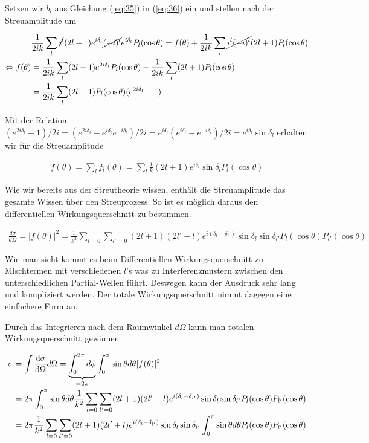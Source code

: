 Setzen wir \(b_l\) aus Gleichung (\ref{eq:35}) in (\ref{eq:36}) ein und stellen nach der Streuamplitude um

\begin{align}
  \label{eq:37}
  &\frac{1}{2ik} \sum_l \cancel{i^{l}}(2l+1)e^{i\delta_l}\cancel{ (-i)^l} e^{i\delta_l}P_{l}(\cos\theta)  = f(\theta) +  \frac{1}{2ik} \sum_{l}\cancel{i^l(-i)^l}(2l+1) P_l(\cos\theta) \notag\\
\Leftrightarrow f(\theta) &= \frac{1}{2ik} \sum_l (2l+1) e^{2i\delta_l}P_{l}(\cos\theta) -  \frac{1}{2ik} \sum_{l}(2l+1) P_l(\cos\theta) \notag\\
&= \frac{1}{2ik} \sum_l  (2l+1)P_{l}(\cos\theta)(e^{2i\delta_l}-1)
\end{align}

Mit der Relation \((e^{2i\delta_l}-1)/2i = (e^{2i\delta_l}-e^{i\delta_l}e^{-i\delta_l})/2i =e^{i\delta_l} (e^{i\delta_l}-e^{-i\delta_l})/2i= e^{i\delta_l}\sin\delta_l\) erhalten wir für die Streuamplitude

\begin{align}
  \label{eq:38}
  \boxed{f(\theta) = \sum_l f_l(\theta) = \sum_l \frac{1}{k} (2l+1)e^{i\delta_l}\sin\delta_l P_{l}(\cos\theta) }
\end{align}

Wie wir bereits aus der Streutheorie wissen, enthält die Streuamplitude das gesamte Wissen über den Streuprozess. So ist es möglich daraus den differentiellen Wirkungsquerschnitt zu bestimmen.

\begin{align}
  \label{eq:39}
  \frac{d\sigma}{d\Omega} = |f(\theta)|^2 = \frac{1}{k^2}\sum_{l=0}\sum_{l'=0}(2l+1)(2l'+l)e^{i(\delta_l - \delta_{l'})}\sin\delta_l\sin\delta_{l'} P_l(\cos\theta)P_{l'}(\cos\theta)
\end{align}

Wie man sieht kommt es beim Differentiellen Wirkungsquerschnitt zu Mischtermen mit verschiedenen \(l\)'s was zu Interferenzmustern zwischen den unterschiedlichen Partial-Wellen führt. Deswegen kann der Ausdruck sehr lang und kompliziert werden. Der totale Wirkungsquerschnitt nimmt dagegen eine einfachere Form an.

Durch das Integrieren nach dem Raumwinkel \(d\Omega\) kann man totalen Wirkungsquerschnitt gewinnen

\begin{align}
  \label{eq:40}
  \sigma &= \int \diff{\sigma}_\Omega d\Omega = \underbr{\int_0^{2\pi}d\phi}_{=2\pi} \int_0^{\pi}\sin\theta d\theta |f(\theta)|^2 \notag\\
 &= 2\pi  \int_0^{\pi}\sin\theta d\theta \frac{1}{k^2}\sum_{l=0}\sum_{l'=0}(2l+1)(2l'+l)e^{i(\delta_l - \delta_{l'})}\sin\delta_l\sin\delta_{l'} P_l(\cos\theta)P_{l'}(\cos\theta) \notag\\
 &= 2\pi  \frac{1}{k^2}\sum_{l=0}\sum_{l'=0}(2l+1)(2l'+l)e^{i(\delta_l - \delta_{l'})}\sin\delta_l\sin\delta_{l'} \int_0^{\pi}\sin\theta d\theta P_l(\cos\theta)P_{l'}(\cos\theta) \notag\\
\end{align}

